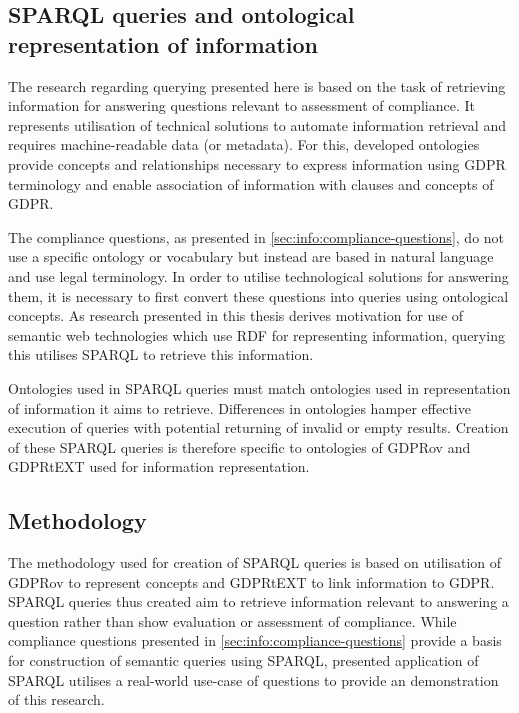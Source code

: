 \subsection{SPARQL queries and ontological representation of information}\label{sec:testing:sparql:relation}
The research regarding querying presented here is based on the task of retrieving information for answering questions relevant to assessment of compliance.
It represents utilisation of technical solutions to automate information retrieval and requires machine-readable data (or metadata).
For this, developed ontologies provide concepts and relationships necessary to express information using GDPR terminology and enable association of information with clauses and concepts of GDPR.

The compliance questions, as presented in \autoref{sec:info:compliance-questions}, do not use a specific ontology or vocabulary but instead are based in natural language and use legal terminology. In order to utilise technological solutions for answering them, it is necessary to first convert these questions into queries using ontological concepts.
As research presented in this thesis derives motivation for use of semantic web technologies which use RDF for representing information, querying this utilises SPARQL to retrieve this information.

Ontologies used in SPARQL queries must match ontologies used in representation of information it aims to retrieve.
Differences in ontologies hamper effective execution of queries with potential returning of invalid or empty results.
Creation of these SPARQL queries is therefore specific to ontologies of GDPRov and GDPRtEXT used for information representation.

\subsection{Methodology}\label{sec:testing:sparql:methodology}
The methodology used for creation of SPARQL queries is based on utilisation of GDPRov to represent concepts and GDPRtEXT to link information to GDPR.
SPARQL queries thus created aim to retrieve information relevant to answering a question rather than show evaluation or assessment of compliance.
While compliance questions presented in \autoref{sec:info:compliance-questions} provide a basis for construction of semantic queries using SPARQL, presented application of SPARQL utilises a real-world use-case of questions to provide an demonstration of this research.

